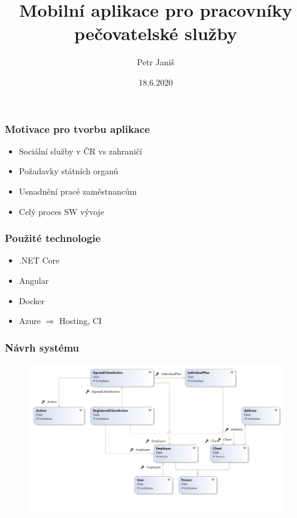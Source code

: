 \documentclass{beamer}
\title[daycare solution]{Mobilní aplikace pro pracovníky pečovatelské služby} %
\author{Petr Janiš} %
\institute[UPOL] %
{
Univerzita Palackého v Olomouci
\\ %
\medskip
}
\date{18.6.2020} %
\begin{document}
\begin{frame}
\titlepage %
\end{frame}

\begin{frame}
\frametitle{Motivace pro tvorbu aplikace}
\begin{itemize}
\item {\large Sociální služby v ČR vs zahraničí}\\[3mm]
\item {\large Požadavky státních organů}\\[3mm]
\item {\large Usnadnění pracé zaměstnancům}\\[3mm]
\item {\large Celý proces SW vývoje}
\end{itemize}
\end{frame}


\begin{frame}
\frametitle{Použité technologie}
\begin{itemize}
\item {\large .NET Core}\\[3mm]
\item {\large Angular}\\[3mm]
\item {\large Docker}\\[3mm]
\item {\large Azure $\Rightarrow$ Hosting, CI}
\end{itemize}
\end{frame}


\begin{frame}
\frametitle{Návrh systému}
\vspace{7mm}
\begin{figure}[center]
  \includegraphics[width=12cm]{obr2.png}
  \label{fig:Github}
\end{figure}
\end{frame}
\end{document}
